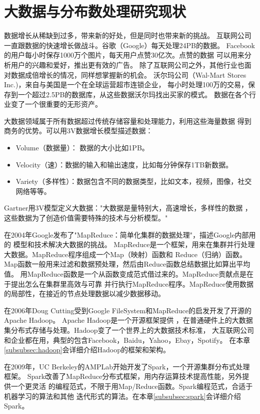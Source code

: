 \section{大数据与分布数处理研究现状}
\label{subsec:bigdata_background}
数据增长从稀缺到过多，带来新的好处，但是同时也带来新的挑战。
互联网公司一直跟数据的快速增长做战斗。谷歌（Google）每天处理24PB的数据。
Facebook的用户每小时保存1000万个图片，每天用户点赞30亿次。点赞的数据
可以用来分析用户的兴趣和爱好，推出更有效的广告。
除了互联网公司之外，其他行业也面对数据成倍增长的情况，同样想掌握新的机会。
沃尔玛公司（Wal-Mart Stores Inc.)，来自与美国是一个在全球运营超市连锁企业，
每小时处理100万的交易，保存到一个超过2.5PB的数据库，从这些数据沃尔玛找出买家的模式。
数据在各个行业变了一个很重要的无形资产。\cite{mayer2013bigdata}

大数据领域属于所有数据超过传统存储容量和处理能力，利用这些海量数据
得到商务的优势。可以用3V数据增长模型描述数据：
\begin{itemize}
  \item Volume（数据量）： 数据的大小比如1PB。
  \item Velocity（速）：数据的输入和输出速度，比如每分钟保存1TB新数据。
  \item Variety（多样性）：数据包含不同的数据类型，比如文本，视频，图像，社交网络等等。
\end{itemize}
Gartner用3V模型定义大数据："大数据是量特别大，高速增长，多样性的数据
，这些数据为了创造价值需要特殊的技术与分析模型。"\cite{bigdatadefinition}

在2004年Google发布了"MapReduce：简单化集群的数据处理"，描述Google内部用的
模型和技术解决大数据的挑战。\cite{dean2008mapreduce}
MapReduce是一个框架，用来在集群并行处理大数据。MapReduce程序组成一个Map（映射）函数和
Reduce（归纳）函数。Map函数一般用来过滤和数据预处理，然后由Reduce函数总结数据比如算出平均值。
用MapReduce函数是一个从函数变成范式借过来的。MapReduce贡献点是在于提出怎么在集群里高效与可靠
并行执行MapReduce程序。MapReduce使用数据的局部性，在接近的节点处理数据以减少数据移动。

在2006年Doug Cutting受到Google FileSystem和MapReduce的启发开发了开源的Apache Hadoop。
\cite{gfs2003, dean2008mapreduce, wiki:hadoop}Apache Hadoop是一个开源框架提供
，在普通硬件上的大数据集分布式存储与处理。Hadoop变了一个世界上的大数据技术标准，
大互联网公司和企业都在用，典型的包含Facebook，Baidu，Yahoo，Ebay，Spotify。
在本章\ref{subsubsec:hadoop}会详细介绍Hadoop的框架和架构。

在2009年，UC Berkeley的AMPLab开始开发了Spark，一个开源集群分布式处理框架。\cite{wiki:spark}
Spark改善了MapReduce分布式框架，用内存运算技术提高性能，另外提供一个更灵活
的编程范式，不限于用Map/Reduce函数。Spark编程范式，合适于机器学习的算法和其他
迭代形式的算法。在本章\ref{subsubsec:spark}会详细介绍Spark。



